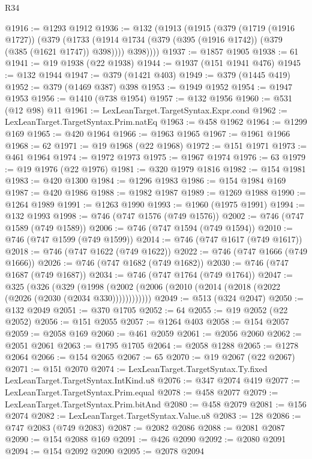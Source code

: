 \begin{lexlean}{R34}
\begin{coremodule}
@1916 := @1293 @1912
@1936 := @132
    (@1913
      (@1915
        (@379
          (@1719 (@1916 @1727))
          (@379
            (@1733 (@1914 @1734 (@379 (@395 (@1916 @1742)) (@379 (@385 (@1621 @1747)) @398))))
            @398))))
@1937 := @1857 @1905
@1938 := 61
@1941 := @19 @1938 (@22 @1938)
@1944 := @1937 (@151 @1941 @476)
@1945 := @132 @1944
@1947 := @379 (@1421 @403)
@1949 := @379 (@1445 @419)
@1952 := @379 (@1469 @387) @398
@1953 := @1949 @1952
@1954 := @1947 @1953
@1956 := @1410 (@738 @1954)
@1957 := @132 @1956
@1960 := @531 (@12 @98) @11
@1961 := LexLeanTarget.TargetSyntax.Expr.cond
@1962 := LexLeanTarget.TargetSyntax.Prim.natEq
@1963 := @458 @1962
@1964 := @1299 @169
@1965 := @420 @1964
@1966 := @1963 @1965
@1967 := @1961 @1966
@1968 := 62
@1971 := @19 @1968 (@22 @1968)
@1972 := @151 @1971
@1973 := @461 @1964
@1974 := @1972 @1973
@1975 := @1967 @1974
@1976 := 63
@1979 := @19 @1976 (@22 @1976)
@1981 := @320 @1979 @1816
@1982 := @154 @1981
@1983 := @420 @1300
@1984 := @1296 @1983
@1986 := @154 @1984 @169
@1987 := @420 @1986
@1988 := @1982 @1987
@1989 := @1269 @1988
@1990 := @1264 @1989
@1991 := @1263 @1990
@1993 := @1960 (@1975 @1991)
@1994 := @132 @1993
@1998 := @746 (@747 @1576 (@749 @1576))
@2002 := @746 (@747 @1589 (@749 @1589))
@2006 := @746 (@747 @1594 (@749 @1594))
@2010 := @746 (@747 @1599 (@749 @1599))
@2014 := @746 (@747 @1617 (@749 @1617))
@2018 := @746 (@747 @1622 (@749 @1622))
@2022 := @746 (@747 @1666 (@749 @1666))
@2026 := @746 (@747 @1682 (@749 @1682))
@2030 := @746 (@747 @1687 (@749 @1687))
@2034 := @746 (@747 @1764 (@749 @1764))
@2047 := @325
    (@326
      (@329 (@1998 (@2002 (@2006 (@2010 (@2014 (@2018 (@2022 (@2026 (@2030 (@2034 @330))))))))))))
@2049 := @513 (@324 @2047)
@2050 := @132 @2049
@2051 := @370 @1705
@2052 := 64
@2055 := @19 @2052 (@22 @2052)
@2056 := @151 @2055
@2057 := @1264 @403
@2058 := @154 @2057
@2059 := @2058 @169
@2060 := @461 @2059
@2061 := @2056 @2060
@2062 := @2051 @2061
@2063 := @1795 @1705
@2064 := @2058 @1288
@2065 := @1278 @2064
@2066 := @154 @2065
@2067 := 65
@2070 := @19 @2067 (@22 @2067)
@2071 := @151 @2070
@2074 := LexLeanTarget.TargetSyntax.Ty.fixed LexLeanTarget.TargetSyntax.IntKind.u8
@2076 := @347 @2074 @419
@2077 := LexLeanTarget.TargetSyntax.Prim.equal
@2078 := @458 @2077
@2079 := LexLeanTarget.TargetSyntax.Prim.bitAnd
@2080 := @458 @2079
@2081 := @156 @2074
@2082 := LexLeanTarget.TargetSyntax.Value.u8
@2083 := 128
@2086 := @747 @2083 (@749 @2083)
@2087 := @2082 @2086
@2088 := @2081 @2087
@2090 := @154 @2088 @169
@2091 := @426 @2090
@2092 := @2080 @2091
@2094 := @154 @2092 @2090
@2095 := @2078 @2094

\end{coremodule}
\end{lexlean}
